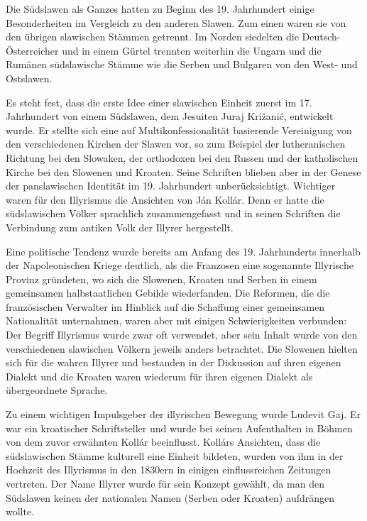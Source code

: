 \documentclass[12pt,headsepline,a4paper]{scrartcl}
\begin{document}
Die Südslawen als Ganzes hatten zu Beginn des 19. Jahrhundert einige Besonderheiten im
Vergleich zu den anderen Slawen. Zum einen waren sie von den übrigen slawischen Stämmen
getrennt. Im Norden siedelten die Deutsch-Österreicher und in einem Gürtel trennten
weiterhin die Ungarn und die Rumänen südslawische Stämme wie die Serben und Bulgaren
von den West- und Ostslawen.

Es steht fest, dass die erste Idee einer slawischen Einheit zuerst im 17. Jahrhundert von einem
Südslawen, dem Jesuiten Juraj Križanić, entwickelt wurde. Er stellte sich eine auf
Multikonfessionalität basierende Vereinigung von den verschiedenen Kirchen der Slawen vor,
so zum Beispiel der lutheranischen Richtung bei den Slowaken, der orthodoxen bei den
Russen und der katholischen Kirche bei den Slowenen und Kroaten.\autocite[232]{nicoll}
Seine Schriften blieben aber in der Genese der panslawischen Identität im 19. Jahrhundert
unberücksichtigt. Wichtiger waren für den Illyrismus die Ansichten von Ján Kollár. Denn er
hatte die südslawischen Völker sprachlich zusammengefasst und in seinen Schriften die
Verbindung zum antiken Volk der Illyrer hergestellt.\autocite[65]{shidak}

Eine politische Tendenz wurde bereits am Anfang des 19. Jahrhunderts innerhalb der
Napoleonischen Kriege deutlich, als die Franzosen eine sogenannte Illyrische Provinz
gründeten, wo sich die Slowenen, Kroaten und Serben in einem gemeinsamen halbstaatlichen
Gebilde wiederfanden. Die Reformen, die die französischen Verwalter im Hinblick auf die
Schaffung einer gemeinsamen Nationalität unternahmen, waren aber mit einigen
Schwierigkeiten verbunden: Der Begriff Illyrismus wurde zwar oft verwendet, aber sein
Inhalt wurde von den verschiedenen slawischen Völkern jeweils anders betrachtet. Die
Slowenen hielten sich für die wahren Illyrer und bestanden in der Diskussion auf ihren
eigenen Dialekt und die Kroaten waren wiederum für ihren eigenen Dialekt als übergeordnete
Sprache.\autocite[62]{kohn}

Zu einem wichtigen Impulsgeber der illyrischen Bewegung wurde Ludevit Gaj. Er war ein
kroatischer Schriftsteller und wurde bei seinen Aufenthalten in Böhmen von dem zuvor
erwähnten Kollár beeinflusst. Kollárs Ansichten, dass die südslawischen Stämme kulturell
eine Einheit bildeten, wurden von ihm in der Hochzeit des Illyrismus in den 1830ern in
einigen einflussreichen Zeitungen vertreten. Der Name Illyrer wurde für sein Konzept
gewählt, da man den Südslawen keinen der nationalen Namen (Serben oder Kroaten)
aufdrängen wollte.\autocite[75]{shidak}
\end{document}
